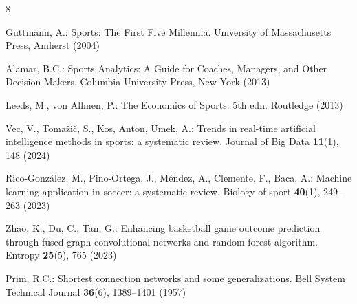 \documentclass[runningheads]{llncs}
\begin{document}
\begin{thebibliography}{8}



Guttmann, A.: Sports: The First Five Millennia. University of Massachusetts Press, Amherst (2004)

Alamar, B.C.: Sports Analytics: A Guide for Coaches, Managers, and Other Decision Makers. Columbia University Press, New York (2013)

Leeds, M., von Allmen, P.: The Economics of Sports. 5th edn. Routledge (2013)

Vec, V., Tomažič, S., Kos, Anton, Umek, A.: Trends in real-time artificial intelligence methods in sports: a systematic review. Journal of Big Data \textbf{11}(1), 148 (2024)

Rico-González, M., Pino-Ortega, J., Méndez, A., Clemente, F., Baca, A.: Machine learning application in soccer: a systematic review. Biology of sport \textbf{40}(1), 249--263 (2023)

Zhao, K., Du, C., Tan, G.: Enhancing basketball game outcome prediction through fused graph convolutional networks and random forest algorithm. Entropy \textbf{25}(5), 765 (2023)




Prim, R.C.: Shortest connection networks and some generalizations. Bell System Technical Journal \textbf{36}(6), 1389--1401 (1957)


\end{thebibliography}
\end{document}
